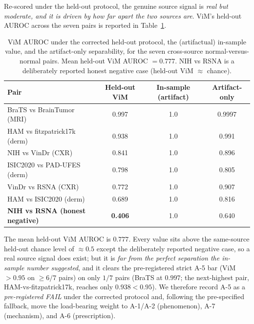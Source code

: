 \documentclass{article}
\begin{document}
Re-scored under the held-out protocol, the genuine source signal is \emph{real
but moderate, and it is driven by how far apart the two sources are}. ViM's
held-out AUROC across the seven pairs is reported in Table~\ref{tab:heldout}.

\begin{table}[t]
  \centering
  \caption{ViM AUROC under the corrected held-out protocol, the (artifactual)
  in-sample value, and the artifact-only separability, for the seven cross-source
  normal-versus-normal pairs. Mean held-out ViM AUROC $=0.777$. NIH vs RSNA is a
  deliberately reported honest negative case (held-out ViM $\approx$ chance).}
  \label{tab:heldout}
  \begin{tabular}{lccc}
    \toprule
    Pair & Held-out ViM & In-sample (artifact) & Artifact-only \\
    \midrule
    BraTS vs BrainTumor (MRI)        & 0.997 & 1.0 & 0.9997 \\
    HAM vs fitzpatrick17k (derm)     & 0.938 & 1.0 & 0.991  \\
    NIH vs VinDr (CXR)               & 0.841 & 1.0 & 0.896  \\
    ISIC2020 vs PAD-UFES (derm)      & 0.798 & 1.0 & 0.805  \\
    VinDr vs RSNA (CXR)              & 0.772 & 1.0 & 0.907  \\
    HAM vs ISIC2020 (derm)           & 0.689 & 1.0 & 0.816  \\
    \textbf{NIH vs RSNA (honest negative)} & \textbf{0.406} & 1.0 & 0.640 \\
    \bottomrule
  \end{tabular}
\end{table}

The mean held-out ViM AUROC is $0.777$. Every value sits above the same-source
held-out chance level of $\approx 0.5$ except the deliberately reported negative
case, so a real source signal does exist; but it is \emph{far from the perfect
separation the in-sample number suggested}, and it clears the pre-registered
strict A-5 bar (ViM $>0.95$ on $\ge 6/7$ pairs) on only $1/7$ pairs (BraTS at
$0.997$; the next-highest pair, HAM-vs-fitzpatrick17k, reaches only $0.938 <
0.95$). We therefore record A-5 as a \emph{pre-registered FAIL}
under the corrected protocol and, following the pre-specified fallback, move the
load-bearing weight to A-1/A-2 (phenomenon), A-7 (mechanism), and A-6
(prescription).
\end{document}
